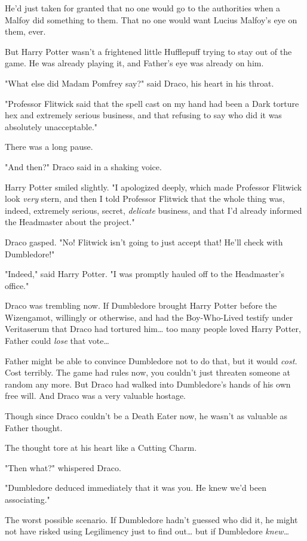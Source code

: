 He'd just taken for granted that no one would go to the authorities when a
Malfoy did something to them. That no one would want Lucius Malfoy's eye on
them, ever.

But Harry Potter wasn't a frightened little Hufflepuff trying to stay out of
the game. He was already playing it, and Father's eye was already on him.

"What else did Madam Pomfrey say?" said Draco, his heart in his throat.

"Professor Flitwick said that the spell cast on my hand had been a Dark torture
hex and extremely serious business, and that refusing to say who did it was
absolutely unacceptable."

There was a long pause.

"And then?" Draco said in a shaking voice.

Harry Potter smiled slightly. "I apologized deeply, which made Professor
Flitwick look \emph{very} stern, and then I told Professor Flitwick that the
whole thing was, indeed, extremely serious, secret, \emph{delicate} business,
and that I'd already informed the Headmaster about the project."

Draco gasped. "No! Flitwick isn't going to just accept that! He'll check with
Dumbledore!"

"Indeed," said Harry Potter. "I was promptly hauled off to the Headmaster's
office."

Draco was trembling now. If Dumbledore brought Harry Potter before the
Wizengamot, willingly or otherwise, and had the Boy-Who-Lived testify under
Veritaserum that Draco had tortured him{\ldots} too many people loved Harry
Potter, Father could \emph{lose} that vote{\ldots}

Father might be able to convince Dumbledore not to do that, but it would
\emph{cost.} Cost terribly. The game had rules now, you couldn't just threaten
someone at random any more. But Draco had walked into Dumbledore's hands of his
own free will. And Draco was a very valuable hostage.

Though since Draco couldn't be a Death Eater now, he wasn't as valuable as
Father thought.

The thought tore at his heart like a Cutting Charm.

"Then what?" whispered Draco.

"Dumbledore deduced immediately that it was you. He knew we'd been associating."

The worst possible scenario. If Dumbledore hadn't guessed who did it, he might
not have risked using Legilimency just to find out{\ldots} but if Dumbledore
\emph{knew{\ldots}}

